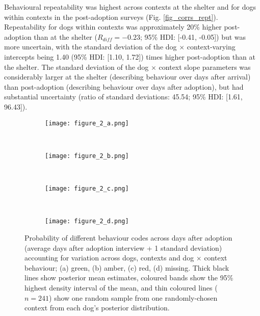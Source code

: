 \documentclass[fleqn,10pt]{wlscirep}
\begin{document}
Behavioural repeatability was highest across contexts at the shelter and for dogs within contexts in the post-adoption surveys (Fig. \ref{fig_corrs_rept}). 
Repeatability for dogs within contexts was approximately 20\% higher post-adoption than at the shelter ($R_{diff} = -0.23$; 95\% HDI: [-0.41, -0.05]) but was more uncertain, with the standard deviation of the dog $\times$ context-varying intercepts being 1.40 (95\% HDI: [1.10, 1.72]) times higher post-adoption than at the shelter. The standard deviation of the dog $\times$ context slope parameters was considerably larger at the shelter (describing behaviour over days after arrival) than post-adoption (describing behaviour over days after adoption), but had substantial uncertainty (ratio of standard deviations: 45.54; 95\% HDI: [1.61, 96.43]).

\begin{figure}
  \hspace{-2cm}%
  \begin{subfigure}{0.4\textwidth}
    \centering
    \texttt{[image: figure\_2\_a.png]}
  \end{subfigure}%
  ~%
  \hspace{-2cm}
  \begin{subfigure}{0.4\textwidth}
    \centering
    \texttt{[image: figure\_2\_b.png]}
  \end{subfigure}%
  ~%
  \hspace{-2cm}
  \begin{subfigure}{0.4\textwidth}
    \centering
    \texttt{[image: figure\_2\_c.png]}
  \end{subfigure}%
  ~%
  \hspace{-2cm}
  \begin{subfigure}{0.4\textwidth}
    \centering
    \texttt{[image: figure\_2\_d.png]}
  \end{subfigure}%

  \caption{Probability of different behaviour codes across days after adoption (average days after adoption interview + 1 standard deviation) accounting for variation across dogs, contexts and dog $\times$ context behaviour; (a) green, (b) amber, (c) red, (d) missing. Thick black lines show posterior mean estimates, coloured bands show the 95\% highest density interval of the mean, and thin coloured lines ($n = 241$) show one random sample from one randomly-chosen context from each dog's posterior distribution.}
  \label{fig_adoption_behaviour}
\end{figure}
\end{document}
